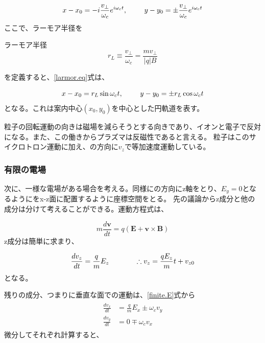 \documentclass{ltjsarticle}
\numberwithin{equation}{section} %
\begin{document}
\begin{equation}
  x - x_0 = -i\frac{v_\perp}{\omega_c}e^{i\omega_c t}, \hspace{2pc} y -y_0 = \pm \frac{v_\perp}{\omega_c}e^{i\omega_c t} \label{larmor.eq}
\end{equation}
ここで、ラーモア半径を

\begin{eqbox}{ラーモア半径}
\begin{equation}
  r_L \equiv \frac{v_\perp}{\omega_c} = \frac{mv_\perp}{|q|B} \label{larmor.radi}
\end{equation}
\end{eqbox}  
を定義すると、\eqref{larmor.eq}式は、

\begin{equation}
  x - x_0 = r_L \sin \omega_c t, \hspace{2pc} y -y_0 = \pm r_L \cos \omega_c t
\end{equation}
となる。これは案内中心$(x_0, y_0)$を中心とした円軌道を表す。

粒子の回転運動の向きは磁場を減らそうとする向きであり、イオンと電子で反対になる。また、この働きからプラズマは反磁性であると言える。
粒子はこのサイクロトロン運動に加え、の方向に$v_z$で等加速度運動している。

\subsubsection{有限の電場}
次に、一様な電場がある場合を考える。同様にの方向にz軸をとり、$E_y=0$となるようにをx-z面に配置するように座標空間をとる。
先の議論からz成分と他の成分は分けて考えることができる。運動方程式は、

\begin{equation}
  m\frac{d\bm{v}}{dt} = q(\bm{E} + \bm{v}\times \bm{B}) \label{finite.E}
\end{equation}
z成分は簡単に求まり、

\begin{equation}
  \frac{dv_z}{dt} = \frac{q}{m}E_z \hspace{3pc} \therefore v_z = \frac{qE_z}{m}t + v_{z0}
\end{equation}
となる。

残りの成分、つまりに垂直な面での運動は、\eqref{finite.E}式から
\begin{align}
  \begin{split}
    \frac{dv_x}{dt} &= \frac{q}{m}E_x \pm \omega_c v_y\\
    \frac{dv_y}{dt} &= 0 \mp \omega_c v_x
  \end{split}
\end{align}
微分してそれぞれ計算すると、
\end{document}
